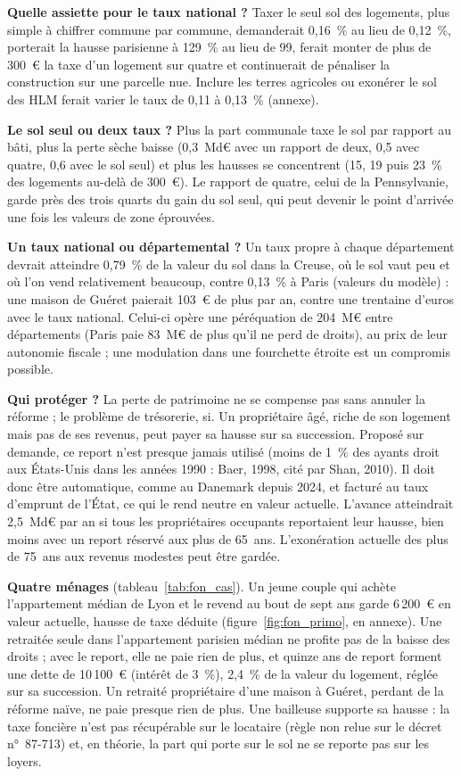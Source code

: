 \textbf{Quelle assiette pour le taux national ?} Taxer le seul sol des logements, plus simple à chiffrer commune par
commune, demanderait 0,16~\% au lieu de 0,12~\%, porterait la hausse parisienne à 129~\% au lieu de 99, ferait monter de
plus de 300~€ la taxe d'un logement sur quatre et continuerait de pénaliser la construction sur une parcelle nue.
Inclure les terres agricoles ou exonérer le sol des HLM ferait varier le taux de 0,11 à 0,13~\% (annexe).

\textbf{Le sol seul ou deux taux ?} Plus la part communale taxe le sol par rapport au bâti, plus la perte sèche baisse
(0,3~Md€ avec un rapport de deux, 0,5 avec quatre, 0,6 avec le sol seul) et plus les hausses se concentrent (15, 19 puis
23~\% des logements au-delà de 300~€). Le rapport de quatre, celui de la Pennsylvanie, garde près des trois quarts du gain
du sol seul, qui peut devenir le point d'arrivée une fois les valeurs de zone éprouvées.

\textbf{Un taux national ou départemental ?} Un taux propre à chaque département devrait atteindre 0,79~\% de la valeur
du sol dans la Creuse, où le sol vaut peu et où l'on vend relativement beaucoup, contre 0,13~\% à Paris (valeurs du
modèle) : une maison de Guéret paierait 103~€ de plus par an, contre une trentaine d'euros avec le taux national. Celui-ci
opère une péréquation de 204~M€ entre départements (Paris paie 83~M€ de plus qu'il ne perd de droits), au prix de leur
autonomie fiscale ; une modulation dans une fourchette étroite est un compromis possible.

\textbf{Qui protéger ?} La perte de patrimoine ne se compense pas sans annuler la réforme ; le problème de trésorerie,
si. Un propriétaire âgé, riche de son logement mais pas de ses revenus, peut payer sa hausse sur sa succession. Proposé
sur demande, ce report n'est presque jamais utilisé (moins de 1~\% des ayants droit aux États-Unis dans les années 1990 :
Baer, 1998, cité par Shan, 2010). Il doit donc être automatique, comme au Danemark depuis 2024, et facturé au taux
d'emprunt de l'État, ce qui le rend neutre en valeur actuelle. L'avance atteindrait 2,5~Md€ par an si tous les propriétaires occupants reportaient
leur hausse, bien moins avec un report réservé aux plus de 65~ans. L'exonération actuelle des plus de 75~ans aux revenus modestes peut être gardée.

\textbf{Quatre ménages} (tableau~\ref{tab:fon_cas}). Un jeune couple qui achète l'appartement médian de Lyon et le revend
au bout de sept ans garde 6\,200~€ en valeur actuelle, hausse de taxe déduite (figure~\ref{fig:fon_primo}, en annexe).
Une retraitée seule dans l'appartement parisien médian ne profite pas de la baisse des droits ; avec le report, elle ne
paie rien de plus, et quinze ans de report forment une dette de 10\,100~€ (intérêt de 3~\%), 2,4~\% de la valeur du
logement, réglée sur sa succession. Un retraité propriétaire d'une maison à Guéret, perdant de la réforme naïve, ne paie
presque rien de plus. Une bailleuse supporte sa hausse : la taxe foncière n'est pas récupérable sur le locataire
(règle non relue sur le décret n°~87-713) et, en théorie, la part qui porte sur le sol ne se reporte pas sur les loyers.

